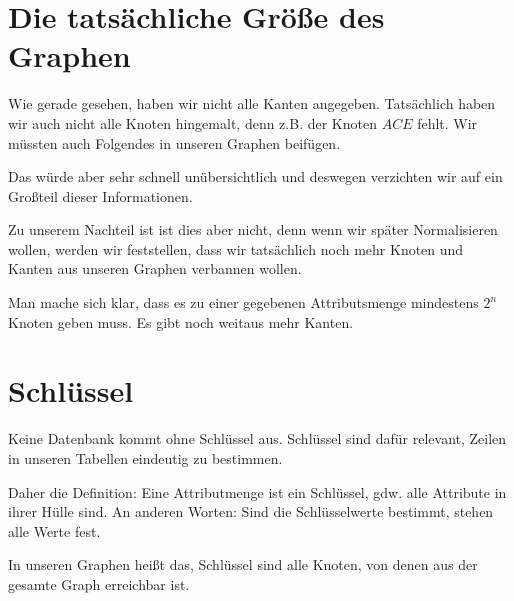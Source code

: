 \documentclass[a4paper, ngerman]{article}
\begin{document}
\section*{Die tatsächliche Größe des Graphen}
Wie gerade gesehen, haben wir nicht alle Kanten angegeben.
Tatsächlich haben wir auch nicht alle Knoten hingemalt,
denn z.B. der Knoten $ACE$ fehlt.
Wir müssten auch Folgendes
in unseren Graphen beifügen.
\begin{center}
\end{center}
Das würde aber sehr schnell unübersichtlich
und deswegen verzichten wir auf
ein Großteil dieser Informationen.

Zu unserem Nachteil ist ist dies aber nicht,
denn wenn wir später Normalisieren wollen,
werden wir feststellen,
dass wir tatsächlich noch mehr Knoten
und Kanten aus unseren Graphen verbannen wollen.

Man mache sich klar, dass es zu einer 
gegebenen Attributsmenge mindestens
$2^n$ Knoten geben muss.
Es gibt noch weitaus mehr Kanten.

\section*{Schlüssel}
Keine Datenbank kommt ohne Schlüssel aus.
Schlüssel sind dafür relevant,
Zeilen in unseren Tabellen eindeutig zu bestimmen.

Daher die Definition:
Eine Attributmenge ist ein Schlüssel,
gdw. alle Attribute in ihrer Hülle sind.
An anderen Worten: Sind die Schlüsselwerte bestimmt,
stehen alle Werte fest.

In unseren Graphen heißt das,
Schlüssel sind alle Knoten,
von denen aus der gesamte Graph erreichbar ist.
\end{document}
